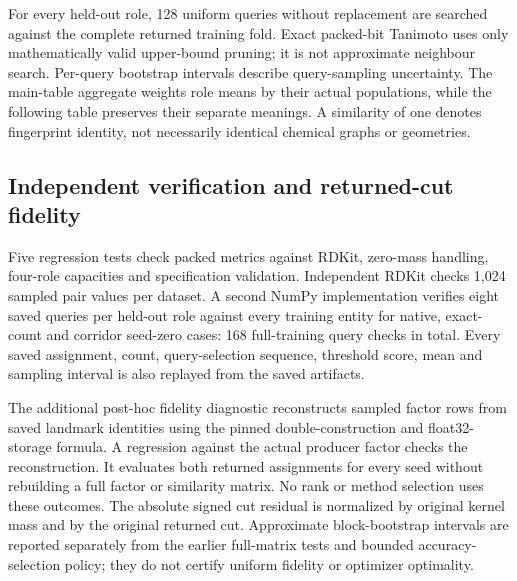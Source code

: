 For every held-out role, 128 uniform queries without replacement are searched
against the complete returned training fold. Exact packed-bit Tanimoto uses
only mathematically valid upper-bound pruning; it is not approximate neighbour
search. Per-query bootstrap intervals describe query-sampling uncertainty. The
main-table aggregate weights role means by their actual populations, while the
following table preserves their separate meanings. A similarity of one denotes
fingerprint identity, not necessarily identical chemical graphs or geometries.




\subsection{Independent verification and returned-cut fidelity}

Five regression tests check packed metrics against RDKit, zero-mass handling,
four-role capacities and specification validation. Independent RDKit checks
1,024 sampled pair values per dataset. A second NumPy implementation verifies
eight saved queries per held-out role against every training entity for native,
exact-count and corridor seed-zero cases: 168 full-training query checks in
total. Every saved assignment, count, query-selection sequence, threshold score,
mean and sampling interval is also replayed from the saved artifacts.

The additional post-hoc fidelity diagnostic reconstructs sampled factor rows
from saved landmark identities using the pinned double-construction and
float32-storage formula. A regression against the actual producer factor
checks the reconstruction. It evaluates both returned assignments for every
seed without rebuilding a full factor or similarity matrix. No rank or method
selection uses these outcomes. The absolute signed cut residual is normalized
by original kernel mass and by the original returned cut. Approximate
block-bootstrap intervals are reported separately from the earlier full-matrix
tests and bounded accuracy-selection policy; they do not certify uniform
fidelity or optimizer optimality.


